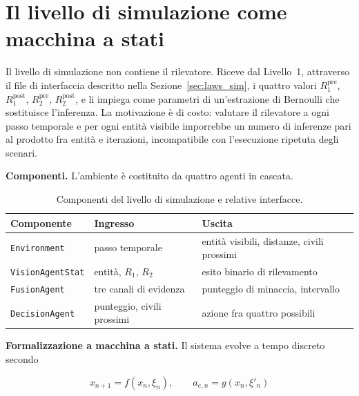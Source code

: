 
\section{Il livello di simulazione come macchina a stati}
\label{sec:automa}

Il livello di simulazione non contiene il rilevatore. Riceve dal Livello~1,
attraverso il file di interfaccia descritto nella
Sezione~\ref{sec:laws_sim}, i quattro valori $R_1^{\text{pre}}$,
$R_1^{\text{post}}$, $R_2^{\text{pre}}$, $R_2^{\text{post}}$, e li impiega come
parametri di un'estrazione di Bernoulli che sostituisce l'inferenza. La
motivazione è di costo: valutare il rilevatore a ogni passo temporale e per
ogni entità visibile imporrebbe un numero di inferenze pari al prodotto fra
entità e iterazioni, incompatibile con l'esecuzione ripetuta degli scenari.

\textbf{Componenti.} L'ambiente è costituito da quattro agenti in cascata.

\begin{table}[htbp]
\centering
\begin{tabular}{lll}
\toprule
\textbf{Componente} & \textbf{Ingresso} & \textbf{Uscita} \\
\midrule
\texttt{Environment} & passo temporale & entità visibili, distanze, civili prossimi \\
\texttt{VisionAgentStat} & entità, $R_1$, $R_2$ & esito binario di rilevamento \\
\texttt{FusionAgent} & tre canali di evidenza & punteggio di minaccia, intervallo \\
\texttt{DecisionAgent} & punteggio, civili prossimi & azione fra quattro possibili \\
\bottomrule
\end{tabular}
\caption{Componenti del livello di simulazione e relative interfacce.}
\label{tab:componenti_sim}
\end{table}

\textbf{Formalizzazione a macchina a stati.} Il sistema evolve a tempo
discreto secondo

\begin{equation}
\label{eq:automa_transizione}
x_{n+1} = f(x_n, \xi_n), \qquad a_{e,n} = g(x_n, \xi'_n)
\end{equation}

